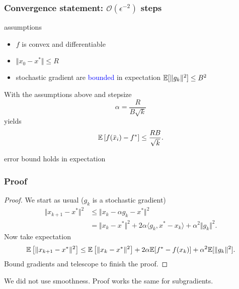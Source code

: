\documentclass{beamer}
\begin{document}
\begin{frame}
  \frametitle{Convergence statement: $\mathcal{O}(\epsilon^{-2})$ steps}
  \begin{block}{assumptions}
    \begin{itemize}
      \item $f$ is convex and differentiable
      \item $\Vert x_0-x^* \Vert \le R$
      \item stochastic gradient are \textcolor{blue}{bounded} in expectation $\mathbb{E}[\Vert g_k \Vert^2] \le B^2$
    \end{itemize}
  \end{block}
  \begin{theorem}
    With the assumptions above and stepsize
    \begin{equation}
      \alpha = \frac{R}{B \sqrt{k}}
    \end{equation}
    yields
    \begin{equation}
      \mathbb{E} \left[ f(\bar{x}_i) - f^*\right] \le \frac{RB}{\sqrt{k}}.
    \end{equation}
  \end{theorem}
  error bound holds in expectation

\end{frame}


\begin{frame}
  \frametitle{Proof}
  \begin{proof}

  We start as usual ($g_k$ is a stochastic gradient)
  \begin{equation}
    \begin{aligned}
      \Vert x_{k+1} - x^* \Vert^2 &\le \Vert x_k - \alpha g_k - x^* \Vert^2 \\
      &= \Vert x_k-x^* \Vert^2 + 2 \alpha \langle g_k, x^*-x_k \rangle + \alpha^2 \Vert g_k \Vert^2.
    \end{aligned}
  \end{equation}
  Now take expectation
  \begin{equation}
      \mathbb{E} \left[\Vert x_{k+1} - x^* \Vert^2\right] \le \mathbb{E} \left[\Vert x_k-x^* \Vert^2\right] + 2 \alpha \mathbb{E}[f^*- f(x_k)]+ \alpha^2 \mathbb{E}[\Vert g_k \Vert^2].
  \end{equation}
  Bound gradients and telescope to finish the proof.
  \end{proof}
  We did not use smoothness. Proof works the same for subgradients.
\end{frame}
\end{document}
